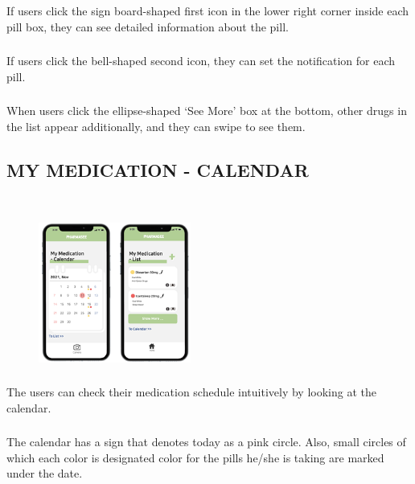 \documentclass[conference]{IEEEtran}
\begin{document}
\subsubsection{} If users click the sign board-shaped first icon in the lower right corner inside each pill box, they can see detailed information about the pill.\\


\subsubsection{}If users click the bell-shaped second icon, they can set the notification for each pill.\\

\subsubsection{}When users click the ellipse-shaped  ‘See More’ box at the bottom, other drugs in the list appear additionally, and they can swipe to see them.\\



\subsection{MY MEDICATION - CALENDAR}\\
\begin{figure}[h!]
\centering
\includegraphics[width=5cm]{imagefolder/medi_calendar.png}
\caption{}
\label{fig:map}
\end{figure}

\subsubsection{}The users can check their medication schedule intuitively by looking at the calendar.\\

\subsubsection{}The calendar has a sign that denotes today as a pink circle. Also, small circles of which each color is designated color for the pills he/she is taking are marked under the date. \\
\end{document}
